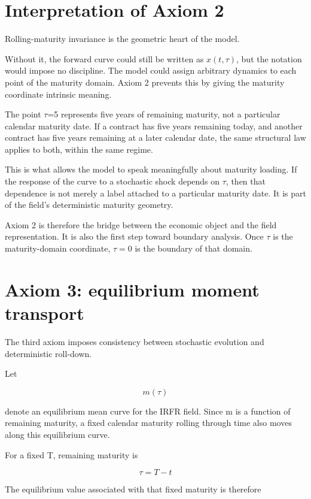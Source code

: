 \documentclass[11pt,oneside]{book}
\begin{document}
\section{Interpretation of Axiom 2}\label{interpretation-of-axiom-2}

Rolling-maturity invariance is the geometric heart of the model.

Without it, the forward curve could still be written as $x(t,\tau)$, but the
notation would impose no discipline. The model could assign arbitrary
dynamics to each point of the maturity domain. Axiom 2 prevents this by
giving the maturity coordinate intrinsic meaning.

The point $\tau$=5 represents five years of remaining maturity, not a
particular calendar maturity date. If a contract has five years
remaining today, and another contract has five years remaining at a
later calendar date, the same structural law applies to both, within the
same regime.

This is what allows the model to speak meaningfully about maturity
loading. If the response of the curve to a stochastic shock depends on
$\tau$, then that dependence is not merely a label attached to a particular
maturity date. It is part of the field's deterministic maturity
geometry.

Axiom 2 is therefore the bridge between the economic object and the
field representation. It is also the first step toward boundary
analysis. Once $\tau$ is the maturity-domain coordinate, $\tau=0$ is the boundary
of that domain.

\section{Axiom 3: equilibrium moment
transport}\label{axiom-3-equilibrium-moment-transport}

The third axiom imposes consistency between stochastic evolution and
deterministic roll-down.

Let

\[
m(\tau)
\]

denote an equilibrium mean curve for the IRFR field. Since m is a
function of remaining maturity, a fixed calendar maturity rolling
through time also moves along this equilibrium curve.

For a fixed T, remaining maturity is

\[
\tau = T - t
\]

The equilibrium value associated with that fixed maturity is therefore
\end{document}

